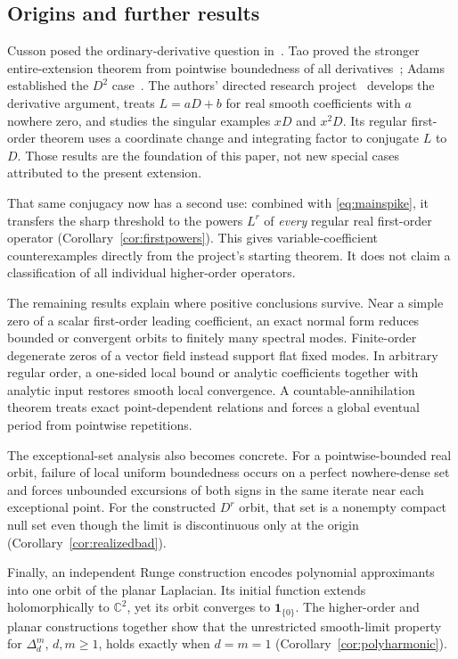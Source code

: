 \documentclass[11pt,reqno]{amsart}
\numberwithin{equation}{section}
\theoremstyle{definition}
\theoremstyle{remark}
\newcommand{\C}{\mathbb C}
\newcommand{\ind}{\mathbf 1}
\begin{document}
\subsection{Origins and further results}
Cusson posed the ordinary-derivative question in~\cite{cusson}. Tao proved the stronger entire-extension theorem from pointwise boundedness of all derivatives~\cite{tao}; Adams established the $D^2$ case~\cite[Theorems 42 and 57]{adams}. The authors' directed research project~\cite{project} develops the derivative argument, treats $L=aD+b$ for real smooth coefficients with $a$ nowhere zero, and studies the singular examples $xD$ and $x^2D$. Its regular first-order theorem uses a coordinate change and integrating factor to conjugate $L$ to $D$. Those results are the foundation of this paper, not new special cases attributed to the present extension.

That same conjugacy now has a second use: combined with \eqref{eq:mainspike}, it transfers the sharp threshold to the powers $L^r$ of \emph{every} regular real first-order operator (Corollary~\ref{cor:firstpowers}). This gives variable-coefficient counterexamples directly from the project's starting theorem. It does not claim a classification of all individual higher-order operators.

The remaining results explain where positive conclusions survive. Near a simple zero of a scalar first-order leading coefficient, an exact normal form reduces bounded or convergent orbits to finitely many spectral modes. Finite-order degenerate zeros of a vector field instead support flat fixed modes. In arbitrary regular order, a one-sided local bound or analytic coefficients together with analytic input restores smooth local convergence. A countable-annihilation theorem treats exact point-dependent relations and forces a global eventual period from pointwise repetitions.

The exceptional-set analysis also becomes concrete. For a pointwise-bounded real orbit, failure of local uniform boundedness occurs on a perfect nowhere-dense set and forces unbounded excursions of both signs in the same iterate near each exceptional point. For the constructed $D^r$ orbit, that set is a nonempty compact null set even though the limit is discontinuous only at the origin (Corollary~\ref{cor:realizedbad}).

Finally, an independent Runge construction encodes polynomial approximants into one orbit of the planar Laplacian. Its initial function extends holomorphically to $\C^2$, yet its orbit converges to $\ind_{\{0\}}$. The higher-order and planar constructions together show that the unrestricted smooth-limit property for $\Delta_d^m$, $d,m\ge1$, holds exactly when $d=m=1$ (Corollary~\ref{cor:polyharmonic}).
\end{document}
